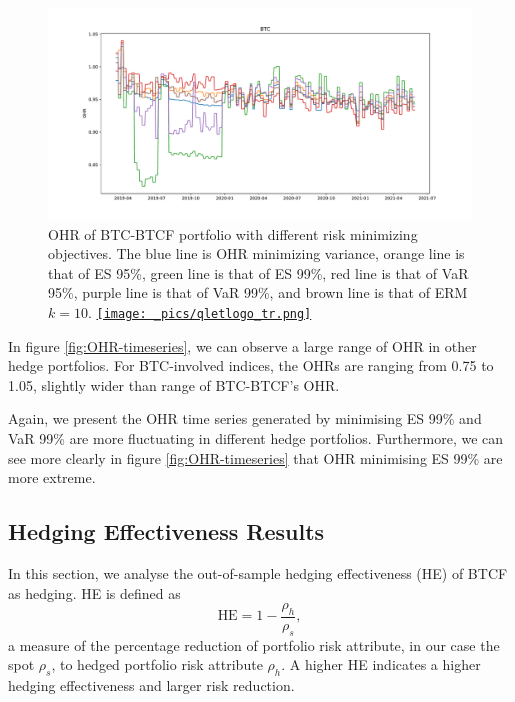 \begin{figure}[t]
\includegraphics[width=\textwidth]{_pics/BTC_OHR.pdf}
  \caption{OHR of BTC-BTCF portfolio with different risk minimizing objectives. The \textcolor{plt1}{blue line} is OHR minimizing variance,
                                      \textcolor{plt2}{orange line} is that of ES 95\%,
                                      \textcolor{plt3}{green line} is that of ES 99\%,
                                      \textcolor{plt4}{red line} is that of VaR 95\%,
                                      \textcolor{plt5}{purple line} is that of VaR 99\%, and
                                      \textcolor{plt6}{brown line} is that of ERM $k=10$.
  \href{http://www.quantlet.com/}{\texttt{[image: \_pics/qletlogo\_tr.png]}} }
\label{fig:BTCOHR}
\end{figure}

In figure \ref{fig:OHR-timeseries}, we can observe a large range of OHR in other hedge portfolios.
For BTC-involved indices, the OHRs are ranging from 0.75 to 1.05, slightly wider than range of BTC-BTCF's OHR. \medskip

Again, we present the OHR time series generated by minimising ES 99\% and VaR 99\% are more fluctuating in different hedge portfolios.
Furthermore, we can see more clearly in figure \ref{fig:OHR-timeseries} that OHR minimising ES 99\% are more extreme. \medskip

\subsection{Hedging Effectiveness Results}\label{sec: HE results}
In this section, we analyse the out-of-sample hedging effectiveness (HE) of BTCF as hedging.
HE is defined as $$\text{HE} = 1-\frac{\rho_h}{\rho_s},$$
a measure of the percentage reduction of portfolio risk attribute, in our case the spot $\rho_s$,
to hedged portfolio risk attribute $\rho_h$.
A higher HE indicates a higher hedging effectiveness and larger risk reduction. \medskip

